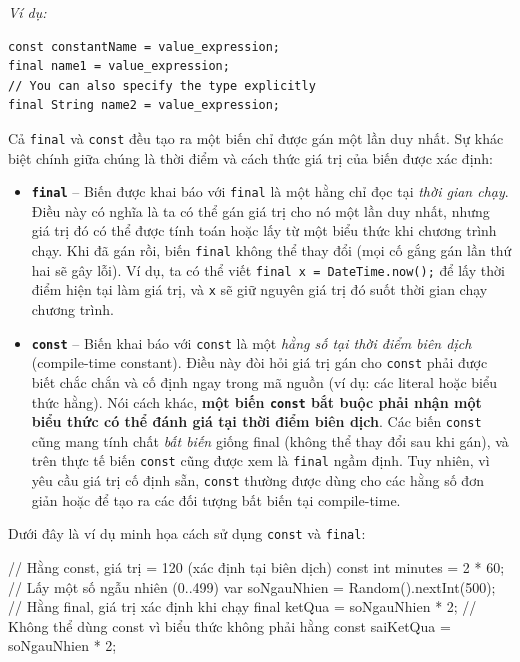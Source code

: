 \documentclass[../DoAn.tex]{subfiles}
\numberwithin{figure}{chapter}
\begin{document}
\textit{Ví dụ:} 
\begin{lstlisting}
const constantName = value_expression;
final name1 = value_expression;
// You can also specify the type explicitly
final String name2 = value_expression;
\end{lstlisting}

Cả \texttt{final} và \texttt{const} đều tạo ra một biến chỉ được gán một lần duy nhất. Sự khác biệt chính giữa chúng là thời điểm và cách thức giá trị của biến được xác định: 
\begin{itemize}
  \item \textbf{\texttt{final}} – Biến được khai báo với \texttt{final} là một hằng chỉ đọc tại \textit{thời gian chạy}. Điều này có nghĩa là ta có thể gán giá trị cho nó một lần duy nhất, nhưng giá trị đó có thể được tính toán hoặc lấy từ một biểu thức khi chương trình chạy. Khi đã gán rồi, biến \texttt{final} không thể thay đổi (mọi cố gắng gán lần thứ hai sẽ gây lỗi). Ví dụ, ta có thể viết \texttt{final x = DateTime.now();} để lấy thời điểm hiện tại làm giá trị, và \texttt{x} sẽ giữ nguyên giá trị đó suốt thời gian chạy chương trình.
  \item \textbf{\texttt{const}} – Biến khai báo với \texttt{const} là một \textit{hằng số tại thời điểm biên dịch} (compile-time constant). Điều này đòi hỏi giá trị gán cho \texttt{const} phải được biết chắc chắn và cố định ngay trong mã nguồn (ví dụ: các literal hoặc biểu thức hằng). Nói cách khác, \textbf{một biến \texttt{const} bắt buộc phải nhận một biểu thức có thể đánh giá tại thời điểm biên dịch}. Các biến \texttt{const} cũng mang tính chất \textit{bất biến} giống final (không thể thay đổi sau khi gán), và trên thực tế biến \texttt{const} cũng được xem là \texttt{final} ngầm định. Tuy nhiên, vì yêu cầu giá trị cố định sẵn, \texttt{const} thường được dùng cho các hằng số đơn giản hoặc để tạo ra các đối tượng bất biến tại compile-time.
\end{itemize}

Dưới đây là ví dụ minh họa cách sử dụng \texttt{const} và \texttt{final}: 

\begin{myverbatim}
// Hằng const, giá trị = 120 (xác định tại biên dịch)
const int minutes = 2 * 60;  
// Lấy một số ngẫu nhiên (0..499)
var soNgauNhien = Random().nextInt(500);    
// Hằng final, giá trị xác định khi chạy
final ketQua = soNgauNhien * 2;        
// Không thể dùng const vì biểu thức không phải hằng    
const saiKetQua = soNgauNhien * 2;     
\end{myverbatim}
\end{document}
